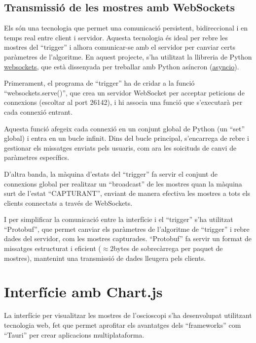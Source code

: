 \documentclass{tfgitic}[2023/06/30]
\begin{document}
\subsection{Transmissió de les mostres amb WebSockets}

Els \cite[WebSockets]{websockets} són una tecnologia que permet
una comunicació persistent, bidireccional i en temps real entre
client i servidor. Aquesta tecnologia és ideal per rebre
les mostres del ``trigger'' i alhora comunicar-se amb el servidor
per canviar certs paràmetres de l'algoritme. En aquest projecte,
s'ha utilitzat la llibreria de Python
\href{https://pypi.org/project/websockets/}{\underline{websockets}}, que està
dissenyada per treballar amb Python asíncron
(\href{https://docs.python.org/3/library/asyncio.html}{\underline{asyncio}}).

Primerament, el programa de ``trigger'' ha de cridar a la funció
``websockets.serve()'', que crea un servidor WebSocket per acceptar
peticions de connexions (escoltar al port 26142), i hi associa una funció que s'executarà
per cada connexió entrant.

Aquesta funció afegeix cada connexió en un conjunt global de Python
(un ``set'' global)
i entra en un bucle infinit. Dins del bucle principal, s'encarrega
de rebre i gestionar els missatges enviats pels usuaris,
com ara les so\lgem icituds de canvi de paràmetres específics.

D'altra banda, la màquina d'estats del ``trigger'' fa
servir el conjunt de connexions global per realitzar un
``broadcast'' de les mostres quan la màquina surt de l'estat
``CAPTURANT'', enviant de manera efectiva les
mostres a tots els clients connectats a través de WebSockets.

I per simplificar la comunicació entre la interfície i el
``trigger'' s'ha utilitzat ``Protobuf'', que permet canviar
els paràmetres de l'algoritme de ``trigger'' i rebre dades
del servidor, com les mostres capturades. ``Protobuf''
fa servir un format de missatges estructurat i eficient
($\approx 2$bytes de sobrecàrrega per paquet de mostres),
mantenint una transmissió de dades lleugera pels clients.

\section{Interfície amb Chart.js}

La interfície per visualitzar les mostres de l'osci\lgem oscopi
s'ha desenvolupat utilitzant tecnologia web, fet que permet
aprofitar els avantatges dels ``frameworks'' com ``Tauri'' per
crear aplicacions multiplataforma.
\end{document}
